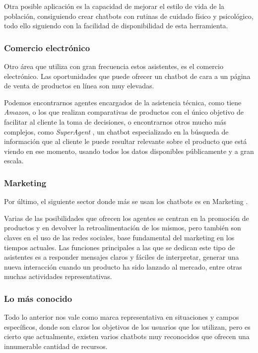 Otra posible aplicación es la capacidad de mejorar el estilo de vida de la población, consiguiendo crear chatbots con rutinas de cuidado físico y psicológico, todo ello siguiendo con la facilidad de disponibilidad de esta herramienta.

\subsubsection{Comercio electrónico}
Otro área que utiliza con gran frecuencia estos asistentes, es el comercio electrónico. Las oportunidades que puede ofrecer un chatbot de cara a un página de venta de productos en línea son muy elevadas. 

Podemos encontrarnos agentes encargados de la asistencia técnica, como tiene \textit{Amazon}, o los que realizan comparativas de productos con el único objetivo de facilitar al cliente la toma de decisiones, o encontrarnos otros mucho más complejos, como \textit{SuperAgent} \cite{cui2017superagent}, un chatbot especializado en la búsqueda de información que al cliente le puede resultar relevante sobre el producto que está viendo en ese momento, usando todos los datos disponibles públicamente y a gran escala. 

\subsubsection{Marketing}
Por último, el siguiente sector donde más se usan los chatbots es en Marketing \cite{barics2020new}. 

Varias de las posibilidades que ofrecen los agentes se centran en la promoción de productos y en devolver la retroalimentación de los mismos, pero también son claves en el uso de las redes sociales, base fundamental del marketing en los tiempos actuales. Las funciones principales a las que se dedican este tipo de asistentes es a responder mensajes claros y fáciles de interpretar, generar una nueva interacción cuando un producto ha sido lanzado al mercado, entre otras muchas actividades representativas.

\subsubsection{Lo más conocido}
Todo lo anterior nos vale como marca representativa en situaciones y campos específicos, donde son claros los objetivos de los usuarios que los utilizan, pero es cierto que actualmente, existen varios chatbots muy reconocidos que ofrecen una innumerable cantidad de recursos. 

